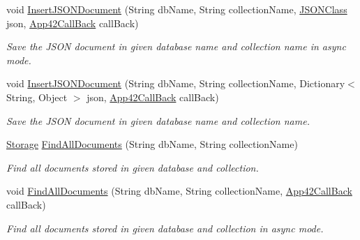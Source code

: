 \begin{DoxyCompactItemize}
void \hyperlink{classcom_1_1shephertz_1_1app42_1_1paas_1_1sdk_1_1csharp_1_1storage_1_1_storage_service_a6948dbdd74ad43db61b4e98ea6818271}{Insert\+J\+S\+O\+N\+Document} (String db\+Name, String collection\+Name, \hyperlink{class_simple_j_s_o_n_1_1_j_s_o_n_class}{J\+S\+O\+N\+Class} json, \hyperlink{interfacecom_1_1shephertz_1_1app42_1_1paas_1_1sdk_1_1csharp_1_1_app42_call_back}{App42\+Call\+Back} call\+Back)
\begin{DoxyCompactList}\small\item\em Save the J\+S\+O\+N document in given database name and collection name in async mode. \end{DoxyCompactList}\item 
void \hyperlink{classcom_1_1shephertz_1_1app42_1_1paas_1_1sdk_1_1csharp_1_1storage_1_1_storage_service_a6b3f35512c147aace710a652b5dcda36}{Insert\+J\+S\+O\+N\+Document} (String db\+Name, String collection\+Name, Dictionary$<$ String, Object $>$ json, \hyperlink{interfacecom_1_1shephertz_1_1app42_1_1paas_1_1sdk_1_1csharp_1_1_app42_call_back}{App42\+Call\+Back} call\+Back)
\begin{DoxyCompactList}\small\item\em Save the J\+S\+O\+N document in given database name and collection name. \end{DoxyCompactList}\item 
\hyperlink{classcom_1_1shephertz_1_1app42_1_1paas_1_1sdk_1_1csharp_1_1storage_1_1_storage}{Storage} \hyperlink{classcom_1_1shephertz_1_1app42_1_1paas_1_1sdk_1_1csharp_1_1storage_1_1_storage_service_a24b174b1de5b2c8501b237bcca931272}{Find\+All\+Documents} (String db\+Name, String collection\+Name)
\begin{DoxyCompactList}\small\item\em Find all documents stored in given database and collection. \end{DoxyCompactList}\item 
void \hyperlink{classcom_1_1shephertz_1_1app42_1_1paas_1_1sdk_1_1csharp_1_1storage_1_1_storage_service_abcc8a2f02528073879fcec1d6d3d5c49}{Find\+All\+Documents} (String db\+Name, String collection\+Name, \hyperlink{interfacecom_1_1shephertz_1_1app42_1_1paas_1_1sdk_1_1csharp_1_1_app42_call_back}{App42\+Call\+Back} call\+Back)
\begin{DoxyCompactList}\small\item\em Find all documents stored in given database and collection in async mode. \end{DoxyCompactList}\item 

\end{DoxyCompactItemize}
